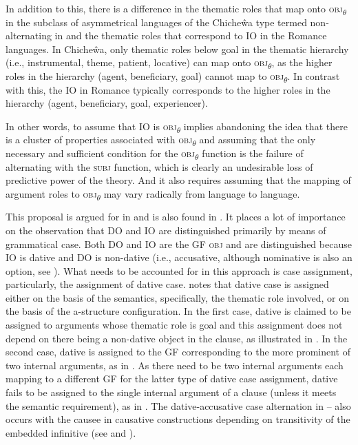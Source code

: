 \documentclass[output=paper,hidelinks]{langscibook}
\begin{document}
In addition to this, there is a difference in the thematic roles that map onto \textsc{obj}\textsubscript{$\theta$} in the subclass of asymmetrical languages of the Chiche\^wa type termed non-alternating in \citet{Alsina:Passive} and the thematic roles that correspond to IO in the Romance languages. In Chiche\^wa, only thematic roles below goal in the thematic hierarchy (i.e., instrumental, theme, patient, locative) can map onto \textsc{obj}\textsubscript{$\theta$}, as the higher roles in the hierarchy (agent, beneficiary, goal) cannot map to \textsc{obj}\textsubscript{$\theta$}. In contrast with this, the IO in Romance typically corresponds to the higher roles in the hierarchy (agent, beneficiary, goal, experiencer).

In other words, to assume that IO is \textsc{obj}\textsubscript{$\theta$} implies abandoning the idea that there is a cluster of properties associated with \textsc{obj}\textsubscript{$\theta$} and assuming that the only necessary and sufficient condition for the \textsc{obj}\textsubscript{$\theta$} function is the failure of alternating with the \textsc{subj} function, which is clearly an undesirable loss of predictive power of the theory. And it also requires assuming that the mapping of argument roles to \textsc{obj}\textsubscript{$\theta$} may vary radically from language to language.

 This proposal is argued for in \citet{alsina1996the-role} and is also found in \citet{Vanhoe2002}. It places a lot of importance on the observation that DO and IO are distinguished primarily by means of grammatical case. Both DO and IO are the GF \textsc{obj} and are distinguished because IO is dative and DO is non-dative (i.e., accusative, although nominative is also an option, see ). What needs to be accounted for in this approach is case assignment, particularly, the assignment of dative case. \citet{alsina1996the-role} notes that dative case is assigned either on the basis of the semantics, specifically, the thematic role involved, or on the basis of the a-structure configuration. In the first case, dative is claimed to be assigned to arguments whose thematic role is goal and this assignment does not depend on there being a non-dative object in the clause, as illustrated in . In the second case, dative is assigned to the GF corresponding to the more prominent of two internal arguments, as in . As there need to be two internal arguments each mapping to a different GF for the latter type of dative case assignment, dative fails to be assigned to the single internal argument of a clause (unless it meets the semantic requirement), as in . The dative-accusative case alternation in -- also occurs with the causee in causative constructions depending on transitivity of the embedded infinitive (see  and ).
\end{document}
